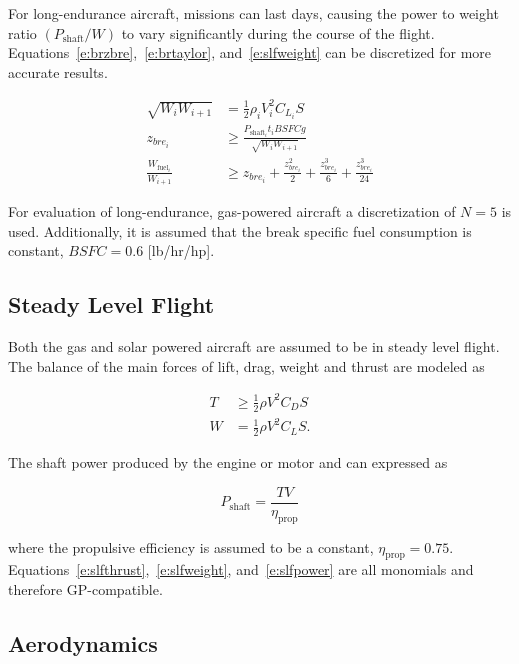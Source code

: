 \documentclass[]{aiaa-tc}%
\begin{document}
    For long-endurance aircraft, missions can last days, causing the power to weight ratio $(P_{\text{shaft}}/W)$ to vary significantly during the course of the flight.  Equations~\ref{e:brzbre},~\ref{e:brtaylor}, and~\ref{e:slfweight} can be discretized for more accurate results.

\begin{align}
    \label{e:slfweightd}
    \sqrt{W_i W_{i+1}} &= \frac{1}{2} \rho_i V_i^2 C_{L_i} S \\
    \label{e:brzbred}
    z_{bre_i} &\geq \frac{P_{\text{shaft}_i}t_i BSFC g}{\sqrt{W_i W_{i+1}}}\\
    \label{e:brtaylord}
    \frac{W_{\text{fuel}_i}}{W_{i+1}} &\geq z_{bre_i} + \frac{z_{bre_i}^2}{2} + \frac{z_{bre_i}^3}{6} + \frac{z_{bre_i}^3}{24} 
    \end{align}

    For evaluation of long-endurance, gas-powered aircraft a discretization of $N=5$ is used. Additionally, it is assumed that the break specific fuel consumption is constant, $BSFC = 0.6$ [lb/hr/hp].

\subsection{Steady Level Flight}

Both the gas and solar powered aircraft are assumed to be in steady level flight.  The balance of the main forces of lift, drag, weight and thrust are modeled as

\begin{align}
    \label{e:slfthrust}
    T &\geq \frac{1}{2} \rho V^2 C_D S\\
    \label{e:slfweight}
    W &= \frac{1}{2} \rho V^2 C_L S . 
\end{align}

The shaft power produced by the engine or motor and can expressed as  

\begin{equation}
    \label{e:slfpower}
    P_{\text{shaft}} = \frac{TV}{\eta_{\text{prop}}}
    \end{equation}

    where the propulsive efficiency is assumed to be a constant, $\eta_{\text{prop}} = 0.75$. Equations~\ref{e:slfthrust},~\ref{e:slfweight}, and~\ref{e:slfpower} are all monomials and therefore GP-compatible.

\subsection{Aerodynamics}
\end{document}
